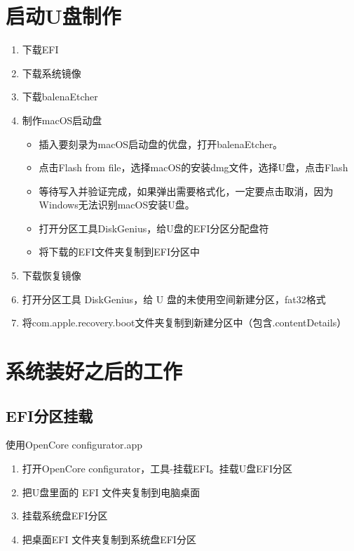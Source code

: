 \documentclass[lang=cn,12pt,chinesefont=founder]{elegantbook}
\begin{document}
\section{启动U盘制作}

\begin{enumerate}
  \item 下载EFI 
  \item 下载系统镜像 
  \item 下载balenaEtcher 
  \item 制作macOS启动盘 
   \begin{itemize}
     \item 插入要刻录为macOS启动盘的优盘，打开balenaEtcher。
     \item 点击Flash from file，选择macOS的安装dmg文件，选择U盘，点击Flash
     \item 等待写入并验证完成，如果弹出需要格式化，一定要点击取消，因为Windows无法识别macOS安装U盘。
     \item 打开分区工具DiskGenius，给U盘的EFI分区分配盘符
     \item 将下载的EFI文件夹复制到EFI分区中
   \end{itemize}
   \item 下载恢复镜像 
   \item 打开分区工具 DiskGenius，给 U 盘的未使用空间新建分区，fat32格式
   \item 将com.apple.recovery.boot文件夹复制到新建分区中（包含.contentDetails）
\end{enumerate}


\section{系统装好之后的工作}

\subsection{EFI分区挂载}

使用OpenCore configurator.app

\begin{enumerate}
  \item 打开OpenCore configurator，工具-挂载EFI。挂载U盘EFI分区
  \item 把U盘里面的 EFI 文件夹复制到电脑桌面
  \item 挂载系统盘EFI分区
  \item 把桌面EFI 文件夹复制到系统盘EFI分区
\end{enumerate}
\end{document}
